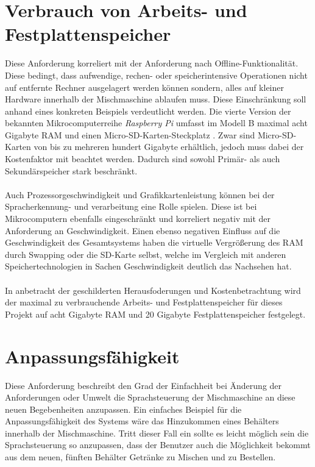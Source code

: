 \section{Verbrauch von Arbeits- und Festplattenspeicher}
Diese Anforderung korreliert mit der Anforderung nach Offline-Funktionalität. Diese bedingt, dass aufwendige, rechen- oder speicherintensive Operationen nicht auf entfernte Rechner ausgelagert werden können sondern, alles auf \glqq{}kleiner\grqq{} Hardware innerhalb der Mischmaschine ablaufen muss. Diese Einschränkung soll anhand eines konkreten Beispiels verdeutlicht werden. Die vierte Version der bekannten Mikrocomputerreihe \textit{Raspberry Pi} umfasst im Modell B maximal acht Gigabyte \ac{RAM} und einen Micro-SD-Karten-Steckplatz \cite{ltd_raspberry_nodate}. Zwar sind Micro-SD-Karten von bis zu mehreren hundert Gigabyte erhältlich, jedoch muss dabei der Kostenfaktor mit beachtet werden. Dadurch sind sowohl Primär- als auch Sekundärspeicher stark beschränkt.\\\\
Auch Prozessorgeschwindigkeit und Grafikkartenleistung können bei der Spracherkennung- und verarbeitung eine Rolle spielen. Diese ist bei Mikrocomputern ebenfalls eingeschränkt und korreliert negativ mit der Anforderung an Geschwindigkeit. Einen ebenso negativen Einfluss auf die Geschwindigkeit des Gesamtsystems haben die virtuelle Vergrößerung des \ac{RAM} durch Swapping oder die SD-Karte selbst, welche im Vergleich mit anderen Speichertechnologien in Sachen Geschwindigkeit deutlich das Nachsehen hat.\\\\
In anbetracht der geschilderten Herausfoderungen und Kostenbetrachtung wird der maximal zu verbrauchende Arbeits- und Festplattenspeicher für dieses Projekt auf acht Gigabyte \ac{RAM} und 20 Gigabyte Festplattenspeicher festgelegt.
\section{Anpassungsfähigkeit}
Diese Anforderung beschreibt den Grad der Einfachheit bei Änderung der Anforderungen oder Umwelt die Sprachsteuerung der Mischmaschine an diese neuen Begebenheiten anzupassen. Ein einfaches Beispiel für die Anpassungsfähigkeit des Systems wäre das Hinzukommen eines Behälters innerhalb der Mischmaschine. Tritt dieser Fall ein sollte es leicht möglich sein die Sprachsteuerung so anzupassen, dass der Benutzer auch die Möglichkeit bekommt aus dem neuen, fünften Behälter Getränke zu Mischen und zu Bestellen. 
\endinput